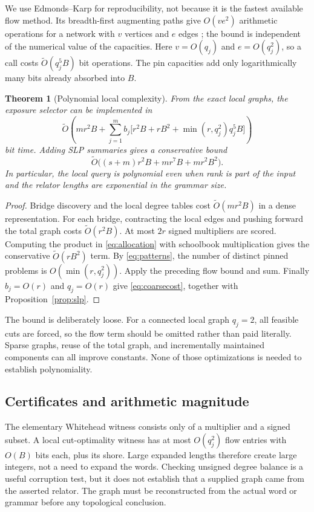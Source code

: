 \documentclass[11pt,letterpaper]{article}
\newtheorem{theorem}{Theorem}[section]
\theoremstyle{definition}\newtheorem{definition}[theorem]{Definition}
\begin{document}
We use Edmonds--Karp for reproducibility, not because it is the fastest available flow method. Its breadth-first augmenting paths give $O(v e^2)$ arithmetic operations for a network with $v$ vertices and $e$ edges \cite{ek}; the bound is independent of the numerical value of the capacities. Here $v=O(q_j)$ and $e=O(q_j^2)$, so a call costs $\widetilde O(q_j^5B)$ bit operations. The pin capacities add only logarithmically many bits already absorbed into $B$.

\begin{theorem}[Polynomial local complexity]\label{thm:localcomplexity}
From the exact local graphs, the exposure selector can be implemented in
\begin{equation}\label{eq:refinedcost}
\widetilde O\!\left(mr^2B+
 \sum_{j=1}^{m} b_j\bigl[r^2B+rB^2+
 \min(r,q_j^2)q_j^5B\bigr]\right)
\end{equation}
bit time. Adding SLP summaries gives a conservative bound
\begin{equation}\label{eq:coarsecost}
 \widetilde O\bigl((s+m)r^2B+mr^7B+mr^2B^2\bigr).
\end{equation}
In particular, the local query is polynomial even when rank is part of the input and the relator lengths are exponential in the grammar size.
\end{theorem}
\begin{proof}
Bridge discovery and the local degree tables cost $\widetilde O(mr^2B)$ in a dense representation. For each bridge, contracting the local edges and pushing forward the total graph costs $\widetilde O(r^2B)$. At most $2r$ signed multipliers are scored. Computing the product in \eqref{eq:allocation} with schoolbook multiplication gives the conservative $\widetilde O(rB^2)$ term. By \eqref{eq:patterns}, the number of distinct pinned problems is $O(\min(r,q_j^2))$. Apply the preceding flow bound and sum. Finally $b_j=O(r)$ and $q_j=O(r)$ give \eqref{eq:coarsecost}, together with Proposition~\ref{prop:slp}.
\end{proof}

The bound is deliberately loose. For a connected local graph $q_j=2$, all feasible cuts are forced, so the flow term should be omitted rather than paid literally. Sparse graphs, reuse of the total graph, and incrementally maintained components can all improve constants. None of those optimizations is needed to establish polynomiality.

\subsection{Certificates and arithmetic magnitude}
The elementary Whitehead witness consists only of a multiplier and a signed subset. A local cut-optimality witness has at most $O(q_j^2)$ flow entries with $O(B)$ bits each, plus its shore. Large expanded lengths therefore create large integers, not a need to expand the words. Checking unsigned degree balance is a useful corruption test, but it does not establish that a supplied graph came from the asserted relator. The graph must be reconstructed from the actual word or grammar before any topological conclusion.
\end{document}

